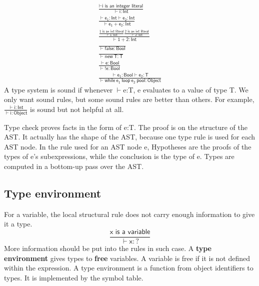 \begin{gather*}
\mathsf{\frac{\vdash\text{i is an integer literal}}{\vdash i:Int}}\\
\mathsf{\frac{\vdash e_1: Int\vdash e_2: Int}{\vdash e_1+e_2:Int}}\\
\mathsf{\frac{\frac{\text{1 is an int literal}}{\vdash 1:Int}\frac{\text{2 is an int literal}}{\vdash 2:Int}}{\vdash 1+2:Int}}\\
\mathsf{\frac{}{\vdash false : Bool}}\\
\mathsf{\frac{}{\vdash new\:T : T}}\\
\mathsf{\frac{\vdash e:Bool}{\vdash!e:Bool}}\\
\mathsf{\frac{\vdash e_1:Bool\vdash e_2: T}{\vdash while\:e_1\:loop\:e_2\:pool:Object}}
\end{gather*}
A type system is sound if whenever $\vdash$e:T, e evaluates to a value of type T. We only want sound rules, but some sound rules are better than others. For example, $\mathsf{\frac{\vdash i:Int}{\vdash i:Object}}$ is sound but not helpful at all.

Type check proves facts in the form of e:T. The proof is on the structure of the AST. It actually has the shape of the AST, because one type rule is used for each AST node. In the rule used for an AST node e, Hypotheses are the proofs of the types of e's subexpressions, while the conclusion is the type of e. Types are computed in a bottom-up pass over the AST.
\subsection{Type environment}
For a variable, the local structural rule does not carry enough information to give it a type. 
\begin{equation*}
\mathsf{\frac{\text{x is a variable}}{\vdash x : ?}}
\end{equation*}
More information should be put into the rules in such case. A {\bf type environment} gives types to {\bf free} variables. A variable is free if it is not defined within the expression. A type environment is a function from object identifiers to types. It is implemented by the symbol table.

